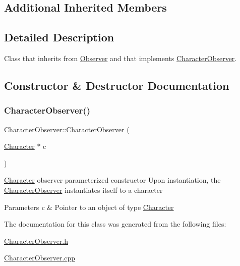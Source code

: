 \subsection*{Additional Inherited Members}


\subsection{Detailed Description}
Class that inherits from \hyperlink{class_observer}{Observer} and that implements \hyperlink{class_character_observer}{Character\+Observer}. 

\subsection{Constructor \& Destructor Documentation}
\hypertarget{class_character_observer_a6a215cb4cdb72aabc0ad95b8b7c0373c}{}\label{class_character_observer_a6a215cb4cdb72aabc0ad95b8b7c0373c} 
\subsubsection{\texorpdfstring{Character\+Observer()}{CharacterObserver()}}
{\footnotesize\ttfamily Character\+Observer\+::\+Character\+Observer (\begin{DoxyParamCaption}\item[{\hyperlink{class_character}{Character} $\ast$}]{c }\end{DoxyParamCaption})}

\hyperlink{class_character}{Character} observer parameterized constructor Upon instantiation, the \hyperlink{class_character_observer}{Character\+Observer} instantiates itself to a character 
\begin{DoxyParams}{Parameters}
{\em c} & Pointer to an object of type \hyperlink{class_character}{Character} \\
\hline
\end{DoxyParams}


The documentation for this class was generated from the following files\+:\begin{DoxyCompactItemize}
\item 
\hyperlink{_character_observer_8h}{Character\+Observer.\+h}\item 
\hyperlink{_character_observer_8cpp}{Character\+Observer.\+cpp}\end{DoxyCompactItemize}
